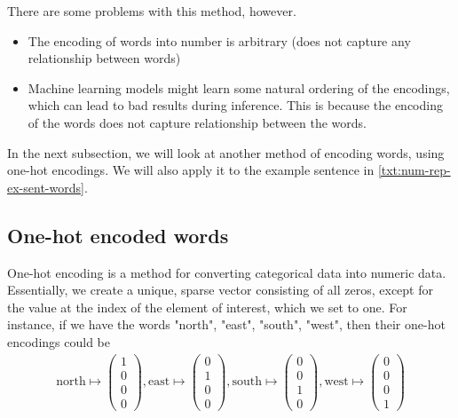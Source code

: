 There are some problems with this method, however.
\begin{itemize}
    \item The encoding of words into number is arbitrary (does not capture any relationship between words)
    \item Machine learning models might learn some natural ordering of the encodings, which can lead to bad results during inference. This is because the encoding of the words does not capture relationship between the words.
\end{itemize}

In the next subsection, we will look at another method of encoding words, using one-hot encodings. We will also apply it to the example sentence in \cref{txt:num-rep-ex-sent-words}.

\subsection{One-hot encoded words}
One-hot encoding is a method for converting categorical data into numeric data. Essentially, we create a unique, sparse vector consisting of all zeros, except for the value at the index of the element of interest, which we set to one. For instance, if we have the words "north", "east", "south", "west", then their one-hot encodings could be
\begin{align}
    \text{north} \mapsto \begin{pmatrix}
    1\\
    0\\
    0\\
    0
    \end{pmatrix},
    \text{east} \mapsto \begin{pmatrix}
    0\\
    1\\
    0\\
    0
    \end{pmatrix},
    \text{south} \mapsto \begin{pmatrix}
    0\\
    0\\
    1\\
    0
    \end{pmatrix},
    \text{west} \mapsto \begin{pmatrix}
    0\\
    0\\
    0\\
    1
    \end{pmatrix}
\end{align}

